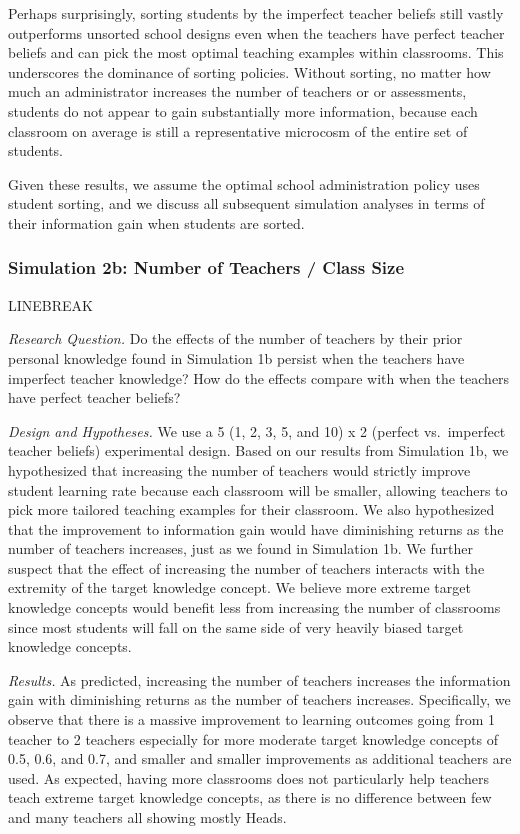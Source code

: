 \documentclass[10pt, letterpaper]{article}
\begin{document}
Perhaps surprisingly, sorting students by the imperfect teacher beliefs
still vastly outperforms unsorted school designs even when the teachers
have perfect teacher beliefs and can pick the most optimal teaching
examples within classrooms. This underscores the dominance of sorting
policies. Without sorting, no matter how much an administrator increases
the number of teachers or or assessments, students do not appear to gain
substantially more information, because each classroom on average is
still a representative microcosm of the entire set of students.

Given these results, we assume the optimal school administration policy
uses student sorting, and we discuss all subsequent simulation analyses
in terms of their information gain when students are sorted.

\subsubsection{Simulation 2b: Number of Teachers / Class
Size}\label{simulation-2b-number-of-teachers-class-size}

LINEBREAK

\emph{Research Question. } Do the effects of the number of teachers by
their prior personal knowledge found in Simulation 1b persist when the
teachers have imperfect teacher knowledge? How do the effects compare
with when the teachers have perfect teacher beliefs?

\emph{Design and Hypotheses. } We use a 5 (1, 2, 3, 5, and 10) x 2
(perfect vs.~imperfect teacher beliefs) experimental design. Based on
our results from Simulation 1b, we hypothesized that increasing the
number of teachers would strictly improve student learning rate because
each classroom will be smaller, allowing teachers to pick more tailored
teaching examples for their classroom. We also hypothesized that the
improvement to information gain would have diminishing returns as the
number of teachers increases, just as we found in Simulation 1b. We
further suspect that the effect of increasing the number of teachers
interacts with the extremity of the target knowledge concept. We believe
more extreme target knowledge concepts would benefit less from
increasing the number of classrooms since most students will fall on the
same side of very heavily biased target knowledge concepts.

\emph{Results. } As predicted, increasing the number of teachers
increases the information gain with diminishing returns as the number of
teachers increases. Specifically, we observe that there is a massive
improvement to learning outcomes going from 1 teacher to 2 teachers
especially for more moderate target knowledge concepts of 0.5, 0.6, and
0.7, and smaller and smaller improvements as additional teachers are
used. As expected, having more classrooms does not particularly help
teachers teach extreme target knowledge concepts, as there is no
difference between few and many teachers all showing mostly Heads.
\end{document}
